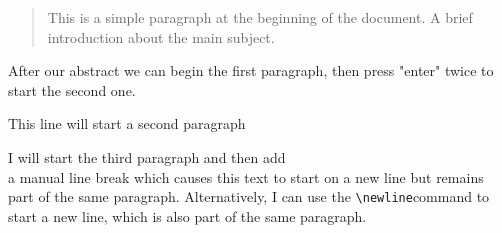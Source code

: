 \documentclass{article}
\begin{document}
    
\begin{abstract}
This is a simple paragraph at the beginning of the document. A brief introduction about the main subject.
\end{abstract}

After our abstract we can begin the first paragraph, then press "enter" twice to start the second one.

This line will start a second paragraph

I will start the third paragraph and then add \\ a manual line break which causes this text to start on a new line but remains part of the same paragraph. 
Alternatively, I can use the \verb|\newline|\newline command to start a new line, which is also part of the same paragraph.
\end{document}

